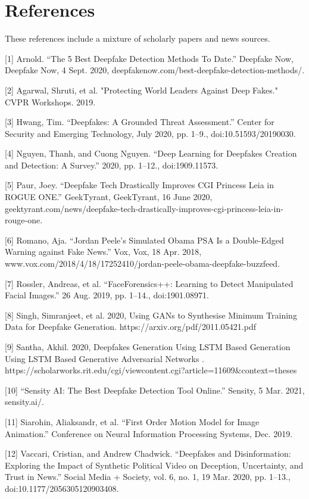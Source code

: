 \documentclass{article}
\begin{document}
\section*{References}

These references include a mixture of scholarly papers and news sources.
\medskip

\small
[1] Arnold. “The 5 Best Deepfake Detection Methods To Date.” Deepfake Now, Deepfake Now, 4 Sept. 2020, deepfakenow.com/best-deepfake-detection-methods/. 

[2] Agarwal, Shruti, et al. "Protecting World Leaders Against Deep Fakes." CVPR Workshops. 2019.

[3] Hwang, Tim. “Deepfakes: A Grounded Threat Assessment.” Center for Security and Emerging Technology, July 2020, pp. 1–9., doi:10.51593/20190030. 

[4] Nguyen, Thanh, and Cuong Nguyen. “Deep Learning for Deepfakes Creation and Detection: A Survey.” 2020, pp. 1–12., doi:1909.11573. 

[5] Paur, Joey. “Deepfake Tech Drastically Improves CGI Princess Leia in ROGUE ONE.” GeekTyrant, GeekTyrant, 16 June 2020, geektyrant.com/news/deepfake-tech-drastically-improves-cgi-princess-leia-in-rouge-one. 

[6] Romano, Aja. “Jordan Peele's Simulated Obama PSA Is a Double-Edged Warning against Fake News.” Vox, Vox, 18 Apr. 2018, www.vox.com/2018/4/18/17252410/jordan-peele-obama-deepfake-buzzfeed. 

[7] Rossler, Andreas, et al. “FaceForensics++: Learning to Detect Manipulated Facial Images.” 26 Aug. 2019, pp. 1–14., doi:1901.08971. 

[8] Singh, Simranjeet, et al. 2020, Using GANs to Synthesise Minimum Training Data for Deepfake Generation. https://arxiv.org/pdf/2011.05421.pdf

[9] Santha, Akhil. 2020, Deepfakes Generation Using LSTM Based Generation Using LSTM Based Generative Adversarial Networks . https://scholarworks.rit.edu/cgi/viewcontent.cgi?article=11609&context=theses

[10] “Sensity AI: The Best Deepfake Detection Tool Online.” Sensity, 5 Mar. 2021, sensity.ai/. 

[11] Siarohin, Aliaksandr, et al. “First Order Motion Model for Image Animation.” Conference on Neural Information Processing Systems, Dec. 2019. 

[12] Vaccari, Cristian, and Andrew Chadwick. “Deepfakes and Disinformation: Exploring the Impact of Synthetic Political Video on Deception, Uncertainty, and Trust in News.” Social Media + Society, vol. 6, no. 1, 19 Mar. 2020, pp. 1–13., doi:10.1177/2056305120903408. 
\end{document}
